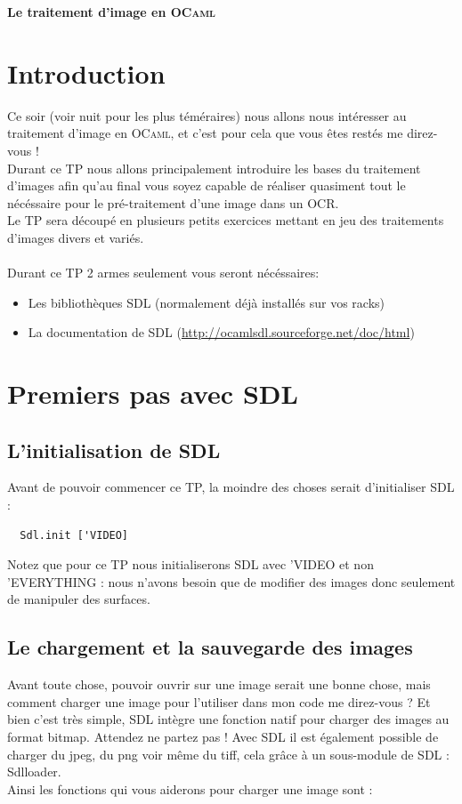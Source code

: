 \documentclass[a4paper]{article}
\begin{document}
\begin{center}
  {\Large {\bf Le traitement d'image en
  \textsc{OCaml}}}
\end{center}

\bigskip

\section*{Introduction}

Ce soir (voir nuit pour les plus téméraires) nous allons nous intéresser au traitement d'image en \textsc{OCaml}, et c'est pour cela que 
vous êtes restés me direz-vous !\\
Durant ce TP nous allons principalement introduire les
 bases du traitement d'images afin qu'au final vous soyez capable de réaliser quasiment tout le nécéssaire
 pour le pré-traitement d'une image dans un OCR.\\\smallskip
Le TP sera découpé en plusieurs petits exercices mettant en jeu des traitements d'images divers et variés.\\\\
Durant ce TP 2 armes seulement vous seront nécéssaires:
\begin{itemize}
\item Les bibliothèques SDL (normalement déjà installés sur vos racks)
\item La documentation de SDL (\url{http://ocamlsdl.sourceforge.net/doc/html})
\end{itemize}


\section{Premiers pas avec SDL}
\subsection{L'initialisation de SDL}
Avant de pouvoir commencer ce TP, la moindre des choses serait d'initialiser SDL :

\begin{verbatim}
  Sdl.init ['VIDEO]
\end{verbatim}

Notez que pour ce TP nous initialiserons SDL avec 'VIDEO et non 'EVERYTHING : nous n'avons besoin que de modifier des images donc seulement de manipuler des surfaces.


\subsection{Le chargement et la sauvegarde des images}
Avant toute chose, pouvoir ouvrir sur une image serait une bonne chose, mais comment charger une image pour l'utiliser dans mon code me direz-vous ?
Et bien c'est très simple, SDL intègre une fonction natif pour charger des images au format bitmap. Attendez ne partez pas ! Avec SDL il est également possible de charger du jpeg, du png voir même du tiff, cela grâce à un sous-module de SDL : Sdlloader.\\\smallskip
Ainsi les fonctions qui vous aiderons pour charger une image sont :
\end{document}
